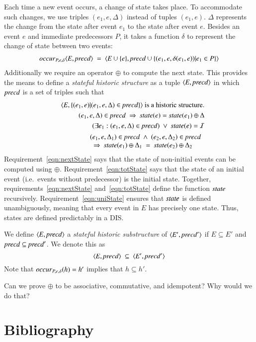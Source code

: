 \documentclass{elsarticle}
\def\id#1{\text{\em #1\/}}
\def\Events{{\mathit E}}
\begin{document}
	Each time a new event occurs, a change of state takes place.
	To accommodate such changes,
	we use triples $(e_1,e,\Delta)$ instead of tuples $(e_1,e)$.
	$\Delta$ represents the change from the state after event $e_1$ to the state after event $e$.
	Besides an event $e$ and immediate predecessors $P$,
	it takes a function $\delta$ to represent the change of state between two events:
\begin{eqnarray}
	\id{occur}_{P,e,\delta}\la \Events, \id{precd}\ra\ =\ \la \Events\cup\{e\}, \id{precd}\cup\{(e_1,e,\delta(e_1,e)) | e_1\in P\}\ra
\end{eqnarray}
	Additionally we require an operator $\oplus$ to compute the next state.
	This provides the means to define a {\em stateful historic structure} as a tuple $\la \Events, \id{precd}\ra$ in which
	$\id{precd}$ is a set of triples such that
\begin{eqnarray}
	&&\la \Events, \{(e_1,e)| (e_1,e,\Delta)\in\id{precd}\}\ra\text{ is a historic structure.}\\
	&&(e_1,e,\Delta)\in\id{precd}\ \Rightarrow\ \id{state}(e)=\id{state}(e_1)\oplus\Delta\label{eqn:nextState}\\
	&&(\exists e_1:(e_1,e,\Delta)\in\id{precd})\ \vee\ \id{state}(e)=\mathcal I\label{eqn:totState}\\
	&&\begin{array}{@{}l}
		(e_1,e,\Delta_1)\in\id{precd}\ \wedge\ (e_2,e,\Delta_2)\in\id{precd}\\
		\ \ \Rightarrow\ \id{state}(e_1)\oplus\Delta_1\ =\ \id{state}(e_2)\oplus\Delta_2\label{eqn:uniState}
	\end{array}
\end{eqnarray}
	Requirement~\ref{eqn:nextState} says that the state of non-initial events can be computed using $\oplus$.
	Requirement~\ref{eqn:totState} says that the state of an initial event (i.e.\ events without predecessor) is the initial state.
	Together, requirements~\ref{eqn:nextState} and~\ref{eqn:totState} define the function $\id{state}$ recursively.
	Requirement~\ref{eqn:uniState} ensures that $\id{state}$ is defined unambiguously,
	meaning that every event in $\Events$ has precisely one state.
	Thus, states are defined predictably in a DIS.

	We define $\la \Events, \id{precd}\ra$ a {\em stateful historic substructure} of $\la \Events', \id{precd}'\ra$
	if $\Events\subseteq\Events'$ and $\id{precd}\subseteq\id{precd}'$.
	We denote this as
\begin{equation}
	\la \Events, \id{precd}\ra\ \subseteq\ \la \Events', \id{precd}'\ra
\end{equation}
	Note that $\id{occur}_{P,e,\delta}(h)=h'$ implies that $h\subseteq h'$.

	Can we prove $\oplus$ to be associative, commutative, and idempotent? Why would we do that?

\section{Bibliography}


\end{document}

